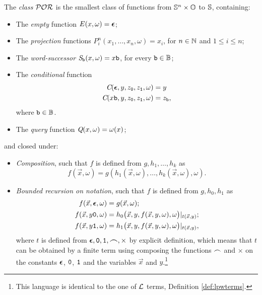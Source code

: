 \begin{defn}
The \emph{class $\mathcal{POR}$} is the smallest class of
functions from
$\mathbb{S}^n\times \mathbb{O}$ to $\mathbb{S}$, containing:
\begin{itemize}
\itemsep0em
%
\item The \emph{empty} function $E(x,\omega)=\bm{\epsilon}$;
%
\item The \emph{projection} functions $P^n_i(x_1,\dots, x_n,\omega)=x_i$, for
$n\in \mathbb{N}$ and $1\leq i\leq n$;
%
\item The \emph{word-successor} $\emph{S}_{\mathtt{b}}(x,\omega)=x\mathtt{b}$, for every $\mathtt{b}\in\mathbb{B}$;
%
\item The \emph{conditional} function
\begin{align*}
\emph{C}(\bm{\epsilon}, y, z_{\mathtt{0}},z_{\mathtt{1}},\omega) &= y \\
\emph{C}(x\mathtt{b}, y,z_{\mathtt{0}}, z_{\mathtt{1}},\omega) &= z_{\mathtt{b}},
\end{align*}
where $\mathtt{b}\in \mathbb{B}$.
%
\item The \emph{query} function $\emph{Q}(x,\omega)=\omega(x)$;
\end{itemize}
and closed under:
\begin{itemize}
%
\item \emph{Composition}, such that $f$
is defined from $g,h_1,\dots, h_k$
as
$$
f(\vec{x},\omega)=g(h_1(\vec{x},\omega), \dots,
h_k(\vec{x},\omega),\omega).
$$
%
\item \emph{Bounded recursion on notation},
such that $f$ is defined from
$g,h_0,h_1$ as
\begin{align*}
f(\vec{x},\bm{\epsilon}, \omega) &= g(\vec{x},\omega); \\
f(\vec{x}, y\mathtt{0},\omega) &= h_0\big(\vec{x},y,f(\vec{x},y,\omega),\omega\big)|_{t(\vec{x},y)}; \\
f(\vec{x},y\mathtt{1},\omega) &= h_1\big(\vec{x},y,f(\vec{x},y,\omega),\omega\big)|_{t(\vec{x},y)},
\end{align*}
\noindent
where $t$
is defined from
$\bm{\epsilon},\mathtt{0},\mathtt{1},\bm{\frown},
\times$ by explicit definition, which means that $t$ can be obtained by a finite term using composing the functions $\frown$ and $\times$ on the constants $\bm{\epsilon}$, $\mathtt{0}$, $\mathtt{1}$ and the variables $\vec x$ and $y$.\footnote{This language is identical to the one of $\mathcal{L}$ terms, Definition \ref{def:lpwterms}.}
\end{itemize}
\end{defn}









